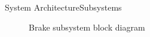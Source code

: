 \documentclass{beamer}
\begin{document}
\begin{frame}{System Architecture}{Subsystems}
\begin{figure}
\begin{tikzpicture}
  \end{tikzpicture}
    \caption{Brake subsystem block diagram}
    \label{fig:brakeModelArchitecture}
\end{figure}




\end{frame}
%
\end{document}

